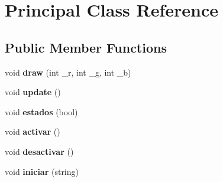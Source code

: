 \hypertarget{class_principal}{}\section{Principal Class Reference}
\label{class_principal}
\subsection*{Public Member Functions}
\begin{DoxyCompactItemize}
\item 
\hypertarget{class_principal_a5f86602728685ff0321be8f97f45d339}{}void {\bfseries draw} (int \+\_\+r, int \+\_\+g, int \+\_\+b)\label{class_principal_a5f86602728685ff0321be8f97f45d339}

\item 
\hypertarget{class_principal_a9ded684f2e0f3c66cce1ce6ec37f63d8}{}void {\bfseries update} ()\label{class_principal_a9ded684f2e0f3c66cce1ce6ec37f63d8}

\item 
\hypertarget{class_principal_acd009737c79f22030d042200c483493f}{}void {\bfseries estados} (bool)\label{class_principal_acd009737c79f22030d042200c483493f}

\item 
\hypertarget{class_principal_a7c0ba9bd013645466da93eab75a7fd4b}{}void {\bfseries activar} ()\label{class_principal_a7c0ba9bd013645466da93eab75a7fd4b}

\item 
\hypertarget{class_principal_ae008133a15874968e0d9ea830f9adaf3}{}void {\bfseries desactivar} ()\label{class_principal_ae008133a15874968e0d9ea830f9adaf3}

\item 
\hypertarget{class_principal_aece6c65fb923c23e45f8e6102e845768}{}void {\bfseries iniciar} (string)\label{class_principal_aece6c65fb923c23e45f8e6102e845768}

\end{DoxyCompactItemize}
